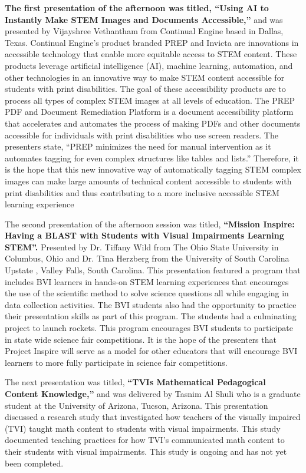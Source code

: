 \documentclass[11.5pt]{sig-alternate}
\begin{document}
\begin{large}
\textbf{The first presentation of the afternoon was titled, “Using AI to Instantly Make STEM Images and Documents Accessible,”} and was presented by Vijayshree Vethantham from Continual Engine based in Dallas, Texas. Continual Engine’s product branded PREP and Invicta are innovations in accessible technology that enable more equitable access to STEM content. These products leverage artificial intelligence (AI), machine learning, automation, and other technologies in an innovative way to make STEM content accessible for students with print disabilities. The goal of these accessibility products are to process all types of complex STEM images at all levels of education. The PREP PDF and Document Remediation Platform is a document accessibility platform that accelerates and automates the process of making PDFs and other documents accessible for individuals with print disabilities who use screen readers. The presenters state, “PREP minimizes the need for manual intervention as it automates tagging for even complex structures like tables and lists.” Therefore, it is the hope that this new innovative way of automatically tagging STEM complex images can make large amounts of technical content accessible to students with print disabilities and thus contributing to a more inclusive accessible STEM learning experience

The second presentation of the afternoon session was titled, \textbf{“Mission Inspire: Having a BLAST with Students with Visual Impairments Learning STEM”.} Presented by Dr. Tiffany Wild from The Ohio State University in Columbus, Ohio and Dr. Tina Herzberg from the University of South Carolina Upstate , Valley Falls, South Carolina. This presentation featured a program that includes BVI learners in hands-on STEM learning experiences that encourages the use of the scientific method to solve science questions all while engaging in data collection activities. The BVI students also had the opportunity to practice their presentation skills as part of this program. The students had a culminating project to launch rockets. This program encourages BVI students to participate in state wide science fair competitions. It is the hope of the presenters that Project Inspire will serve as a model for other educators that will encourage BVI learners to more fully participate in science fair competitions.

The next presentation was titled, \textbf{“TVIs Mathematical Pedagogical Content Knowledge,”} and was delivered by Tasnim Al Shuli who is a graduate student at the University of Arizona, Tucson, Arizona. This presentation discussed a research study that investigated how teachers of the visually impaired (TVI) taught math content to students with visual impairments. This study documented teaching practices for how TVI’s communicated math content to their students with visual impairments. This study is ongoing and has not yet been completed.


\end{large}
\end{document}
